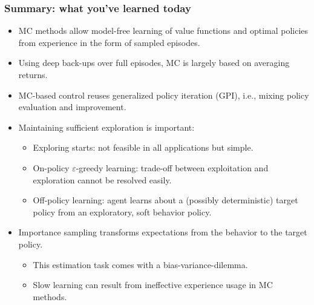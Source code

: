 \begin{frame}
\frametitle{Summary: what you've learned today}
\begin{itemize}
	\item MC methods allow model-free learning of value functions and optimal policies from experience in the form of sampled episodes. \pause
	\item Using deep back-ups over full episodes, MC is largely based on averaging returns. \pause
	\item MC-based control reuses generalized policy iteration (GPI), i.e., mixing policy evaluation and improvement. \pause
	\item Maintaining sufficient exploration is important:
	\begin{itemize}
		\item Exploring starts: not feasible in all applications but simple. \pause
		\item On-policy $\varepsilon$-greedy learning: trade-off between exploitation and exploration cannot be resolved easily. \pause
		\item Off-policy learning: agent learns about a (possibly deterministic) target policy from an exploratory, soft behavior policy.
	\end{itemize}\pause
	\item Importance sampling transforms expectations from the behavior to the target policy.
	\begin{itemize}
		\item This estimation task comes with a bias-variance-dilemma.  \pause
		\item Slow learning can result from ineffective experience usage in MC methods.
	\end{itemize}
\end{itemize}
\end{frame}
